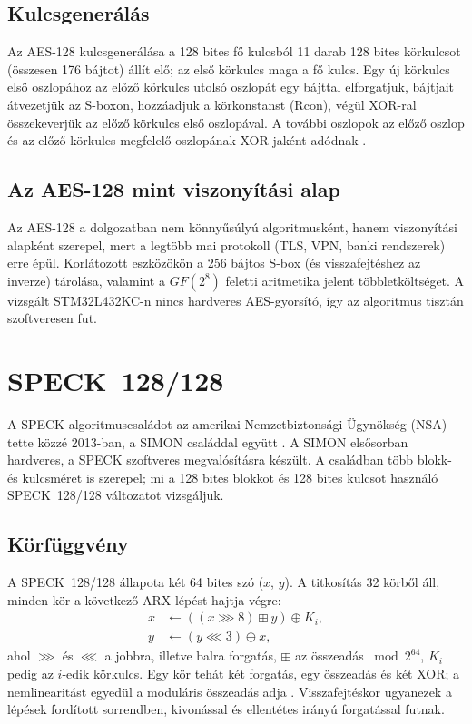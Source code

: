 \documentclass[a4paper,12pt]{report}
\theoremstyle{definition}
\theoremstyle{remark}
\begin{document}
\subsection{Kulcsgenerálás}\label{sec:aes_kulcs}

Az AES-128 kulcsgenerálása a 128 bites fő kulcsból 11 darab 128 bites körkulcsot (összesen 176 bájtot) állít elő; az első körkulcs maga a fő kulcs. Egy új körkulcs első oszlopához az előző körkulcs utolsó oszlopát egy bájttal elforgatjuk, bájtjait átvezetjük az S-boxon, hozzáadjuk a körkonstanst (Rcon), végül XOR-ral összekeverjük az előző körkulcs első oszlopával. A további oszlopok az előző oszlop és az előző körkulcs megfelelő oszlopának XOR-jaként adódnak \cite{DaemenRijmen2002}.

\subsection{Az AES-128 mint viszonyítási alap}

Az AES-128 a dolgozatban nem könnyűsúlyú algoritmusként, hanem viszonyítási alapként szerepel, mert a legtöbb mai protokoll (TLS, VPN, banki rendszerek) erre épül. Korlátozott eszközökön a 256 bájtos S-box (és visszafejtéshez az inverze) tárolása, valamint a $GF(2^8)$ feletti aritmetika jelent többletköltséget. A vizsgált STM32L432KC-n nincs hardveres AES-gyorsító, így az algoritmus tisztán szoftveresen fut.

\section{SPECK~128/128}\label{sec:speck}

A SPECK algoritmuscsaládot az amerikai Nemzetbiztonsági Ügynökség (NSA) tette közzé 2013-ban, a SIMON családdal együtt \cite{Beaulieu2013}. A SIMON elsősorban hardveres, a SPECK szoftveres megvalósításra készült. A családban több blokk- és kulcsméret is szerepel; mi a 128 bites blokkot és 128 bites kulcsot használó SPECK~128/128 változatot vizsgáljuk.

\subsection{Körfüggvény}\label{sec:speck_kor}

A SPECK~128/128 állapota két 64 bites szó ($x$, $y$). A titkosítás 32 körből áll, minden kör a következő ARX-lépést hajtja végre:
\begin{align}
x &\leftarrow ((x \ggg 8) \mathbin{\boxplus} y) \oplus K_i, \label{eq:speck_round1}\\
y &\leftarrow (y \lll 3) \oplus x, \label{eq:speck_round2}
\end{align}
ahol $\ggg$ és $\lll$ a jobbra, illetve balra forgatás, $\boxplus$ az összeadás $\bmod 2^{64}$, $K_i$ pedig az $i$-edik körkulcs. Egy kör tehát két forgatás, egy összeadás és két XOR; a nemlinearitást egyedül a moduláris összeadás adja \cite{Beaulieu2013}. Visszafejtéskor ugyanezek a lépések fordított sorrendben, kivonással és ellentétes irányú forgatással futnak.
\end{document}
